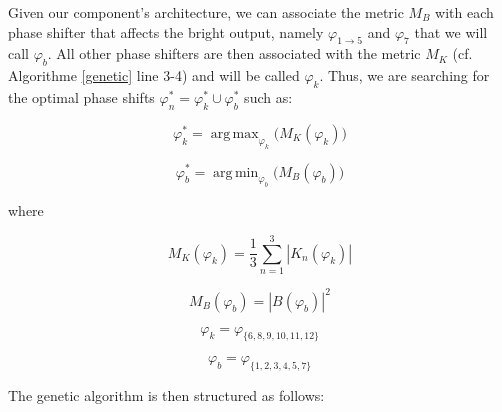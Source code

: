 \documentclass{aa}
\DeclareMathOperator*{\argmax}{arg\,max}
\DeclareMathOperator*{\argmin}{arg\,min}
\begin{document}
            Given our component's architecture, we can associate the metric $M_B$ with each phase shifter that affects the bright output, namely $\varphi_{1 \rightarrow 5}$ and $\varphi_7$ that we will call $\varphi_b$. All other phase shifters are then associated with the metric $M_K$ (cf. Algorithme \ref{genetic} line 3-4) and will be called $\varphi_k$. Thus, we are searching for the optimal phase shifts $\varphi_n^* = \varphi_k^* \cup \varphi_b^*$ such as:

            \begin{equation}
                \varphi_k^* = \argmax_{\varphi_k} \Big( M_K(\varphi_k) \Big)
            \end{equation}

            \begin{equation}
                \varphi_b^* = \argmin_{\varphi_b} \Big( M_B(\varphi_b) \Big)
            \end{equation}

            where
            
            \begin{equation}
                M_K(\varphi_k) = \frac{1}{3}\sum_{n=1}^3 |K_n(\varphi_k)|
            \end{equation}

            \begin{equation}
                M_B(\varphi_b) = |B(\varphi_b)|^2
            \end{equation}

            \begin{equation}
                \varphi_k = \varphi_{\{6,8,9,10,11,12\}}
            \end{equation}

            \begin{equation}
                \varphi_b = \varphi_{\{1,2,3,4,5,7\}}
            \end{equation}

            The genetic algorithm is then structured as follows:
\end{document}

